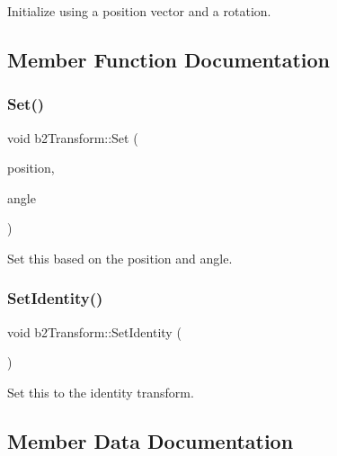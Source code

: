 Initialize using a position vector and a rotation. 



\subsection{Member Function Documentation}
\mbox{\label{structb2_transform_a4db696a0b3fada95f95cde3e7e85ced9}} 
\subsubsection{\texorpdfstring{Set()}{Set()}}
{\footnotesize\ttfamily void b2\+Transform\+::\+Set (\begin{DoxyParamCaption}\item[{const \mbox{\hyperlink{structb2_vec2}{b2\+Vec2}} \&}]{position,  }\item[{\mbox{\hyperlink{b2_settings_8h_aacdc525d6f7bddb3ae95d5c311bd06a1}{float32}}}]{angle }\end{DoxyParamCaption})\hspace{0.3cm}{\ttfamily [inline]}}



Set this based on the position and angle. 

\mbox{\label{structb2_transform_af92af4ec6833552b1b22a6ca6d4f5644}} 
\subsubsection{\texorpdfstring{SetIdentity()}{SetIdentity()}}
{\footnotesize\ttfamily void b2\+Transform\+::\+Set\+Identity (\begin{DoxyParamCaption}{ }\end{DoxyParamCaption})\hspace{0.3cm}{\ttfamily [inline]}}



Set this to the identity transform. 



\subsection{Member Data Documentation}
\mbox{\label{structb2_transform_a9eeeb643a016c29a4d389e480ba6c628}} 
